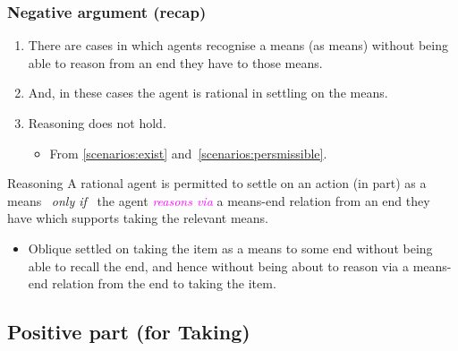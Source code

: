 \documentclass[noamssymb,
graphics,
]{beamer} %
\newcommand{\hand}{\ding{43}}
\newcommand{\schemaName}[1]{\textsf{#1}}
\newcommand{\hozlinedash}[0]{
  \noindent\hdashrule[0.5ex][c]{\textwidth}{.1pt}{2.5pt}
}
\begin{document}
\begin{frame}
  \frametitle{Negative argument (recap)}

  {%
  \begin{enumerate}
  \item\label{scenarios:exist} There are cases in which agents recognise a means (as means) without being able to reason from an end they have to those means.
  \item\label{scenarios:persmissible} And, in these cases the agent is rational in settling on the means.

  \item \schemaName{Reasoning} does not hold.
    \begin{itemize}
    \item From \ref{scenarios:exist} and~\ref{scenarios:persmissible}.
    \end{itemize}
  \end{enumerate}
  }

  \hozlinedash
  {\footnotesize
    \begin{block}{Reasoning}
      A rational agent is permitted to settle on an action (in part) as a means
      \newline
      \mbox{ }\hfill\emph{only if}\hfill\mbox{ }
      \newline
      the agent \textcolor{fuchsia}{\emph{reasons via}}  a means-end relation from an end they have which supports taking the relevant means.
    \end{block}
  }
  \begin{itemize}
  \item<2>[\hand] Oblique settled on taking the item as a means to some end without being able to recall the end, and hence without being about to reason via a means-end relation from the end to taking the item.
  \end{itemize}
\end{frame}

\subsection{Positive part (for \schemaName{Taking})}
\label{sec:positive}
\end{document}

